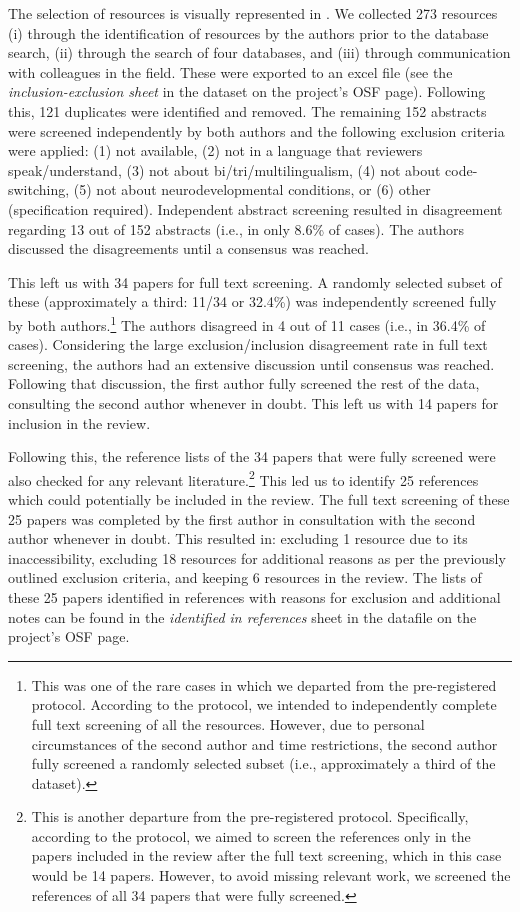 \documentclass[output=paper]{langscibook}
\begin{document}
The selection of resources is visually represented in . We collected 273 resources (i) through the identification of resources by the authors prior to the database search, (ii) through the search of four databases, and (iii) through communication with colleagues in the field. These were exported to an excel file (see the \textit{inclusion-exclusion sheet} in the dataset on the project's OSF page). Following this, 121 duplicates were identified and removed. The remaining 152 abstracts were screened independently by both authors and the following exclusion criteria were applied:
(1) not available,
(2) not in a language that reviewers speak/understand,
(3) not about bi/tri/multilingualism,
(4) not about code-switching,
(5) not about neurodevelopmental conditions, or
(6) other (specification required). Independent abstract screening resulted in disagreement regarding 13 out of 152 abstracts (i.e., in only 8.6\% of cases). The authors discussed the disagreements until a consensus was reached.

This left us with 34 papers for full text screening. A randomly selected subset of these (approximately a third: 11/34 or 32.4\%) was independently screened fully by both authors.\footnote{This was one of the rare cases in which we departed from the pre-registered protocol. According to the protocol, we intended to independently complete full text screening of all the resources. However, due to personal circumstances of the second author and time restrictions, the second author fully screened a randomly selected subset (i.e., approximately a third of the dataset).}  The authors disagreed in 4 out of 11 cases (i.e., in 36.4\% of cases). Considering the large exclusion/inclusion disagreement rate in full text screening, the authors had an extensive discussion until consensus was reached. Following that discussion, the first author fully screened the rest of the data, consulting the second author whenever in doubt. This left us with 14 papers for inclusion in the review.

Following this, the reference lists of the 34 papers that were fully screened were also checked for any relevant literature.\footnote{This is another departure from the pre-registered protocol. Specifically, according to the protocol, we aimed to screen the references only in the papers included in the review after the full text screening, which in this case would be 14 papers. However, to avoid missing relevant work, we screened the references of all 34 papers that were fully screened.} This led us to identify 25 references which could potentially be included in the review. The full text screening of these 25 papers was completed by the first author in consultation with the second author whenever in doubt. This resulted in: excluding 1 resource due to its inaccessibility, excluding 18 resources for additional reasons as per the previously outlined exclusion criteria, and keeping 6 resources in the review. The lists of these 25 papers identified in references with reasons for exclusion and additional notes can be found in the \textit{identified in references} sheet in the datafile on the project's OSF page.
\end{document}
